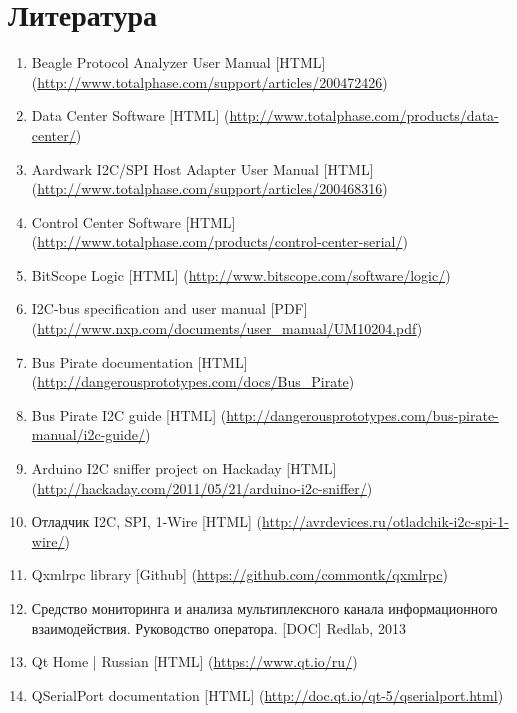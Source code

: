 \section*{Литература}

\begin{enumerate}
 \sloppy
 \item \label{beagle_protocol_analyzer} Beagle Protocol Analyzer User Manual [HTML] (\url{http://www.totalphase.com/support/articles/200472426})
 \item \label{tp_data_center} Data Center Software [HTML] (\url{http://www.totalphase.com/products/data-center/})
 \item \label{aardwark_adapter} Aardwark I2C/SPI Host Adapter User Manual [HTML] (\url{http://www.totalphase.com/support/articles/200468316})
 \item \label{tp_control_center} Control Center Software [HTML] (\url{http://www.totalphase.com/products/control-center-serial/})
 \item \label{bitscope_logic} BitScope Logic [HTML] (\url{http://www.bitscope.com/software/logic/})
 \item \label{i2c_protocol_spec} I2C-bus specification and user manual [PDF] (\url{http://www.nxp.com/documents/user_manual/UM10204.pdf})
 \item \label{buspirate_descr} Bus Pirate documentation [HTML] (\url{http://dangerousprototypes.com/docs/Bus_Pirate})
 \item \label{buspirate_i2c} Bus Pirate I2C guide [HTML] (\url{http://dangerousprototypes.com/bus-pirate-manual/i2c-guide/})
 \item \label{arduino-i2c-sniffer} Arduino I2C sniffer project on Hackaday [HTML] (\url{http://hackaday.com/2011/05/21/arduino-i2c-sniffer/})
 \item \label{i2c-spi-1w-debugger} Отладчик I2C, SPI, 1-Wire [HTML] (\url{http://avrdevices.ru/otladchik-i2c-spi-1-wire/})
 \item \label{qxmlrpc} Qxmlrpc library [Github] (\url{https://github.com/commontk/qxmlrpc})
 \item \label{sma_manual} Средство мониторинга и анализа мультиплексного канала информационного взаимодействия. Руководство оператора. [DOC] Redlab, 2013
 \item \label{qt_home} Qt Home | Russian [HTML] (\url{https://www.qt.io/ru/})
 \item \label{qtserialport} QSerialPort documentation [HTML] (\url{http://doc.qt.io/qt-5/qserialport.html})
\end{enumerate}
